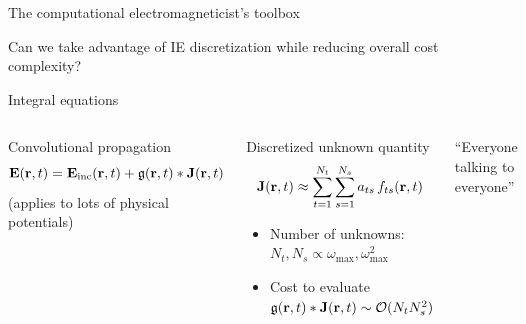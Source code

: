 \documentclass[aspectratio=169, usenames, dvipsnames]{beamer}
\begin{document}
\begin{frame}{The computational electromagneticist's toolbox}
  \begin{center}
    
    \vspace{-0.5cm}
  \end{center}
  Can we take advantage of IE discretization while reducing overall cost complexity?
\end{frame}

\begin{frame}{Integral equations}
  \begin{columns}
    \begin{block}{Convolutional propagation}
      \begin{equation*}
        \vb{E}(\vb{r}, t) = \vb{E}_\text{inc}(\vb{r}, t) + \mathfrak{g}(\vb{r}, t) * \vb{J}(\vb{r}, t)
      \end{equation*}
      \hfill \tiny{(applies to lots of physical potentials)}
    \end{block}

    \begin{block}{Discretized unknown quantity}
      \begin{equation*}
        \vb{J}(\vb{r}, t) \approx \sum_{t=1}^{N_t} \sum_{s=1}^{N_s} a_{ts} \, f_{ts}(\vb{r}, t)
      \end{equation*}
      \begin{itemize}
        \item Number of unknowns: $N_t, N_s \propto \omega_\text{max}, \omega_\text{max}^2$
        \item Cost to evaluate $\mathfrak{g}(\vb{r}, t) * \vb{J}(\vb{r}, t) \sim \mathcal{O}(N_t N_s^2)$
      \end{itemize}
    \end{block}

      \begin{center}
        
        {\small ``Everyone talking to everyone''}
      \end{center}
  \end{columns}
\end{frame}
\end{document}
